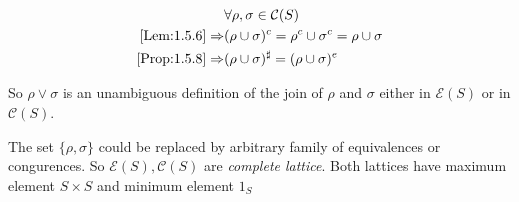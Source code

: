 \begin{Sym}
    \begin{align*}
        & \forall \rho, \sigma \in \mathcal{C}(S)   \\
        \ref{Lem:1.5.6} \Rightarrow& (\rho \cup \sigma)^c = \rho^c \cup \sigma^c = \rho \cup \sigma      \\
        \ref{Prop:1.5.8} \Rightarrow& (\rho \cup \sigma)^{\sharp} = (\rho \cup \sigma)^e
    \end{align*}

    So $\rho \vee \sigma$ is an unambiguous definition of the join of $\rho$ and $\sigma$ either in $\mathcal{E}(S)$ or in $\mathcal{C}(S)$.

    The set $\{\rho, \sigma\}$ could be replaced by arbitrary family of equivalences or congurences. So $\mathcal{E}(S), \mathcal{C}(S)$ are \emph{complete lattice}. Both lattices have maximum element $S \times S$ and minimum element $1_S$
\end{Sym}

